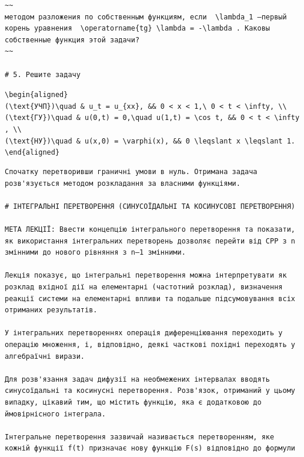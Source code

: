 \documentclass[
  ukrainian,
]{article}
\begin{document}
\begin{verbatim}
~~
методом разложения по собственным функциям, если  \lambda_1 —первый корень уравнения  \operatorname{tg} \lambda = -\lambda . Каковы собственные функция этой задачи?
~~

# 5. Решите задачу
\end{verbatim}

\texttt{\textbackslash{}begin\{aligned\}}
\texttt{(\textbackslash{}text\{УЧП\})\textbackslash{}quad\ \&\ u\_t\ =\ u\_\{xx\},\ \&\&\ 0\ \textless{}\ x\ \textless{}\ 1,\textbackslash{}\ 0\ \textless{}\ t\ \textless{}\ \textbackslash{}infty,\ \textbackslash{}\textbackslash{}}
\texttt{(\textbackslash{}text\{ГУ\})\textbackslash{}quad\ \&\ u(0,t)\ =\ 0,\textbackslash{}quad\ u(1,t)\ =\ \textbackslash{}cos\ t,\ \&\&\ 0\ \textless{}\ t\ \textless{}\ \textbackslash{}infty,\ \textbackslash{}\textbackslash{}}
\texttt{(\textbackslash{}text\{НУ\})\textbackslash{}quad\ \&\ u(x,0)\ =\ \textbackslash{}varphi(x),\ \&\&\ 0\ \textbackslash{}leqslant\ x\ \textbackslash{}leqslant\ 1.}
\texttt{\textbackslash{}end\{aligned\}}

\begin{verbatim}
Спочатку перетворивши граничні умови в нуль. Отримана задача розв'язується методом розкладання за власними функціями.

# ІНТЕГРАЛЬНІ ПЕРЕТВОРЕННЯ (СИНУСОЇДАЛЬНІ ТА КОСИНУСОВІ ПЕРЕТВОРЕННЯ)

МЕТА ЛЕКЦІЇ: Ввести концепцію інтегрального перетворення та показати, як використання інтегральних перетворень дозволяє перейти від CPP з n змінними до нового рівняння з n—1 змінними.

Лекція показує, що інтегральні перетворення можна інтерпретувати як розклад вхідної дії на елементарні (частотний розклад), визначення реакції системи на елементарні впливи та подальше підсумовування всіх отриманих результатів.

У інтегральних перетвореннях операція диференціювання переходить у операцію множення, і, відповідно, деякі часткові похідні переходять у алгебраїчні вирази.

Для розв'язання задач дифузії на необмежених інтервалах вводять синусоїдальні та косинусні перетворення. Розв'язок, отриманий у цьому випадку, цікавий тим, що містить функцію, яка є додатковою до ймовірнісного інтеграла.

Інтегральне перетворення зазвичай називається перетворенням, яке кожній функції f(t) призначає нову функцію F(s) відповідно до формули
\end{verbatim}
\end{document}
